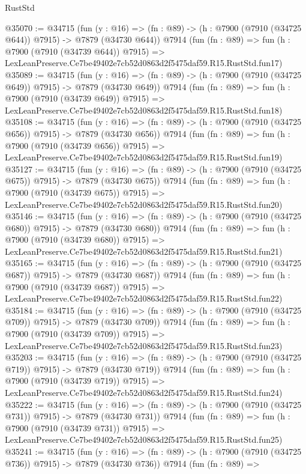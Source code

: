 \begin{lexlean}{RustStd}
\begin{coremodule}
@35070 := @34715
    (fun (y : @16) => (fn : @89) -> (h : @7900 (@7910 (@34725 @644)) @7915) -> @7879 (@34730 @644))
    @7914
    (fun (fn : @89) =>
    fun (h : @7900 (@7910 (@34739 @644)) @7915) =>
    LexLeanPreserve.Ce7be49402e7cb52d0863d2f5475daf59.R15.RustStd.fun17)
@35089 := @34715
    (fun (y : @16) => (fn : @89) -> (h : @7900 (@7910 (@34725 @649)) @7915) -> @7879 (@34730 @649))
    @7914
    (fun (fn : @89) =>
    fun (h : @7900 (@7910 (@34739 @649)) @7915) =>
    LexLeanPreserve.Ce7be49402e7cb52d0863d2f5475daf59.R15.RustStd.fun18)
@35108 := @34715
    (fun (y : @16) => (fn : @89) -> (h : @7900 (@7910 (@34725 @656)) @7915) -> @7879 (@34730 @656))
    @7914
    (fun (fn : @89) =>
    fun (h : @7900 (@7910 (@34739 @656)) @7915) =>
    LexLeanPreserve.Ce7be49402e7cb52d0863d2f5475daf59.R15.RustStd.fun19)
@35127 := @34715
    (fun (y : @16) => (fn : @89) -> (h : @7900 (@7910 (@34725 @675)) @7915) -> @7879 (@34730 @675))
    @7914
    (fun (fn : @89) =>
    fun (h : @7900 (@7910 (@34739 @675)) @7915) =>
    LexLeanPreserve.Ce7be49402e7cb52d0863d2f5475daf59.R15.RustStd.fun20)
@35146 := @34715
    (fun (y : @16) => (fn : @89) -> (h : @7900 (@7910 (@34725 @680)) @7915) -> @7879 (@34730 @680))
    @7914
    (fun (fn : @89) =>
    fun (h : @7900 (@7910 (@34739 @680)) @7915) =>
    LexLeanPreserve.Ce7be49402e7cb52d0863d2f5475daf59.R15.RustStd.fun21)
@35165 := @34715
    (fun (y : @16) => (fn : @89) -> (h : @7900 (@7910 (@34725 @687)) @7915) -> @7879 (@34730 @687))
    @7914
    (fun (fn : @89) =>
    fun (h : @7900 (@7910 (@34739 @687)) @7915) =>
    LexLeanPreserve.Ce7be49402e7cb52d0863d2f5475daf59.R15.RustStd.fun22)
@35184 := @34715
    (fun (y : @16) => (fn : @89) -> (h : @7900 (@7910 (@34725 @709)) @7915) -> @7879 (@34730 @709))
    @7914
    (fun (fn : @89) =>
    fun (h : @7900 (@7910 (@34739 @709)) @7915) =>
    LexLeanPreserve.Ce7be49402e7cb52d0863d2f5475daf59.R15.RustStd.fun23)
@35203 := @34715
    (fun (y : @16) => (fn : @89) -> (h : @7900 (@7910 (@34725 @719)) @7915) -> @7879 (@34730 @719))
    @7914
    (fun (fn : @89) =>
    fun (h : @7900 (@7910 (@34739 @719)) @7915) =>
    LexLeanPreserve.Ce7be49402e7cb52d0863d2f5475daf59.R15.RustStd.fun24)
@35222 := @34715
    (fun (y : @16) => (fn : @89) -> (h : @7900 (@7910 (@34725 @731)) @7915) -> @7879 (@34730 @731))
    @7914
    (fun (fn : @89) =>
    fun (h : @7900 (@7910 (@34739 @731)) @7915) =>
    LexLeanPreserve.Ce7be49402e7cb52d0863d2f5475daf59.R15.RustStd.fun25)
@35241 := @34715
    (fun (y : @16) => (fn : @89) -> (h : @7900 (@7910 (@34725 @736)) @7915) -> @7879 (@34730 @736))
    @7914
    (fun (fn : @89) =>

\end{coremodule}
\end{lexlean}
